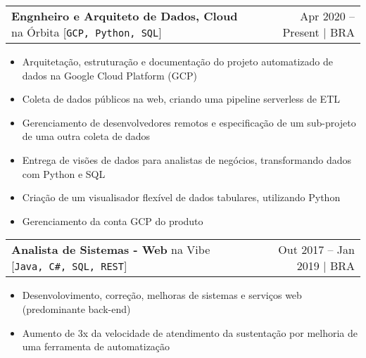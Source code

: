 \documentclass[a4paper,11pt]{article}
\makeatletter
\newcommand{\udensdot}[1]{%
    \tikz[baseline=(todotted.base)]{
        \node[inner sep=0.5pt,outer sep=0.5pt] (todotted) {#1};
        \draw[densely dotted] (todotted.south west) -- (todotted.south east);
    }%
}%
\newcommand{\myHref}[2]{\udensdot{\hspace{-1.2pt}\href{#1}{#2}\hspace{-4pt}}\hspace{-1.2pt}}
\newcommand{\myHrefIcn}[2]{#2 \href{#1}{\scriptsize{\faExternalLink{}}}}
\newcommand{\resumeItemCustom}[1]{
  \item\small{#1 \vspace{-2pt}}
}
\newcommand{\resumeJobSubheadingD}[7]{
  \vspace{0pt}\item
    \begin{tabular*}{0.97\textwidth}{l@{\extracolsep{\fill}}r}
      \textbf{#4} na \myHrefIcn{#1}{#2} \hspace{3pt} [\small \texttt{#6}] & {\small #5}
    \end{tabular*}\vspace{-6pt}
}
\newcommand{\resumeItemListStart}{\begin{itemize}}
\newcommand{\resumeItemListEnd}{\end{itemize}\vspace{-5pt}}
\newcommand{\csharp}{C\#}
\makeatother
\begin{document}
    \resumeJobSubheadingD
      {http://orbita.srv.br/}{Órbita}{}%
      {Engnheiro e Arquiteto de Dados, Cloud}{Apr 2020 -- Present $\vert$ BRA}
      {GCP, Python, SQL}%
      {Data platform creation, automated data integration}
      \resumeItemListStart
        \resumeItemCustom{Arquitetação, estruturação e documentação do projeto automatizado de dados na Google Cloud Platform (GCP)}
        \resumeItemCustom{Coleta de dados públicos na web, criando uma pipeline serverless de ETL}
        \resumeItemCustom{Gerenciamento de desenvolvedores remotos e especificação de um sub-projeto de uma outra coleta de dados}
        \resumeItemCustom{Entrega de visões de dados para analistas de negócios, transformando dados com Python e SQL}
        \resumeItemCustom{Criação de um visualisador flexível de dados tabulares, utilizando Python}
        \resumeItemCustom{Gerenciamento da conta GCP do produto}
      \resumeItemListEnd
    
    \resumeJobSubheadingD
      {http://www.vibedesenv.com/}{Vibe}{Tecnologia para negócios}%
      {Analista de Sistemas - Web}{Out 2017 -- Jan 2019 $\vert$ BRA}
      {Java, \csharp, SQL, REST}%
      {Aplicativos web de Internet Banking, sistemas de gerenciamento, serviços web para o banco \myHref{http://www.banpara.b.br/}{Banpará}}
      \resumeItemListStart
        \resumeItemCustom{Desenvolovimento, correção, melhoras de sistemas e serviços web (predominante back-end)}
        \resumeItemCustom{Aumento de 3x da velocidade de atendimento da sustentação por melhoria de uma ferramenta de automatização}
      \resumeItemListEnd
\end{document}
